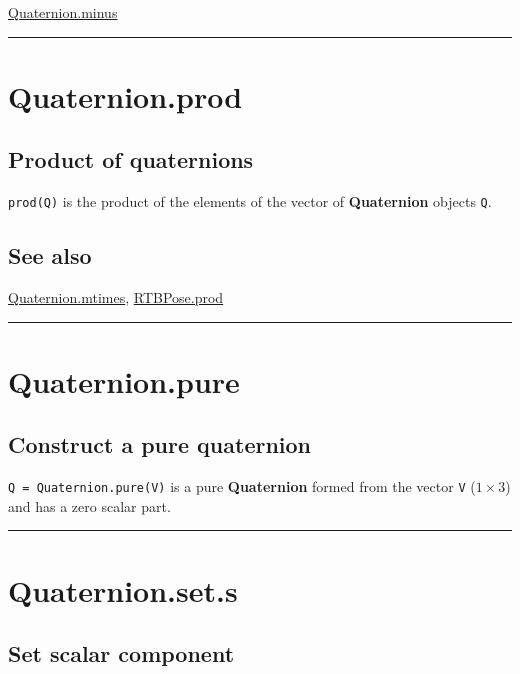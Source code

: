 \hyperlink{Quaternion.minus}{\color{blue} Quaternion.minus}

\vspace{1.5ex}\hrule

\hypertarget{Quaternion.prod}{\section*{Quaternion.prod}}
\subsection*{Product of quaternions}


\texttt{prod(Q)} is the product of the elements of the vector of \textbf{\color{red} Quaternion} objects \texttt{Q}.


\subsection*{See also}


\hyperlink{Quaternion.mtimes}{\color{blue} Quaternion.mtimes}, \hyperlink{RTBPose.prod}{\color{blue} RTBPose.prod}

\vspace{1.5ex}\hrule

\hypertarget{Quaternion.pure}{\section*{Quaternion.pure}}
\subsection*{Construct a pure quaternion}


\texttt{Q = Quaternion.pure(V)} is a pure \textbf{\color{red} Quaternion} formed from the vector \texttt{V} ($1 \times 3$) and has
a zero scalar part.

\vspace{1.5ex}\hrule

\hypertarget{Quaternion.set.s}{\section*{Quaternion.set.s}}
\subsection*{Set scalar component}


